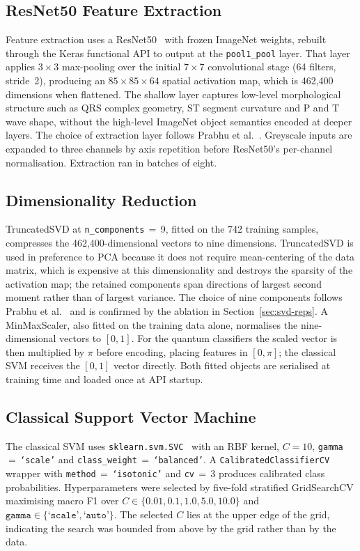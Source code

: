 \documentclass[10pt,conference]{IEEEtran}
\begin{document}
\subsection{ResNet50 Feature Extraction}

Feature extraction uses a ResNet50~\cite{he2016} with frozen ImageNet
weights, rebuilt through the Keras functional API to output at the
\texttt{pool1\_pool} layer. That layer applies $3\!\times\!3$
max-pooling over the initial $7\!\times\!7$ convolutional stage (64
filters, stride~2), producing an $85\!\times\!85\!\times\!64$ spatial
activation map, which is 462,400 dimensions when flattened. The shallow
layer captures low-level morphological structure such as QRS complex
geometry, ST segment curvature and P and T wave shape, without the
high-level ImageNet object semantics encoded at deeper layers. The
choice of extraction layer follows Prabhu et al.~\cite{prabhu2023}.
Greyscale inputs are expanded to three channels by axis repetition
before ResNet50's per-channel normalisation. Extraction ran in batches
of eight.

\subsection{Dimensionality Reduction}

TruncatedSVD at \texttt{n\_components}\,$=$\,9, fitted on the 742
training samples, compresses the 462,400-dimensional vectors to nine
dimensions. TruncatedSVD is used in preference to PCA because it does
not require mean-centering of the data matrix, which is expensive at
this dimensionality and destroys the sparsity of the activation map;
the retained components span directions of largest second moment rather
than of largest variance. The choice of nine components follows Prabhu
et al.~\cite{prabhu2023} and is confirmed by the ablation in
Section~\ref{sec:svd-reps}. A MinMaxScaler, also fitted on the training
data alone, normalises the nine-dimensional vectors to $[0,1]$. For the
quantum classifiers the scaled vector is then multiplied by $\pi$ before
encoding, placing features in $[0,\pi]$; the classical SVM receives the
$[0,1]$ vector directly. Both fitted objects are serialised at training
time and loaded once at API startup.

\subsection{Classical Support Vector Machine}

The classical SVM uses \texttt{sklearn.svm.SVC}~\cite{sklearn} with an
RBF kernel, $C\!=\!10$, \texttt{gamma}\,$=$\,\texttt{`scale'} and
\texttt{class\_weight}\,$=$\,\texttt{`balanced'}. A
\texttt{CalibratedClassifierCV} wrapper with
\texttt{method}\,$=$\,\texttt{`isotonic'} and \texttt{cv}\,$=$\,3
produces calibrated class probabilities. Hyperparameters were selected
by five-fold stratified GridSearchCV maximising macro F1 over
$C\in\{0.01,0.1,1.0,5.0,10.0\}$ and
$\texttt{gamma}\in\{\texttt{`scale'},\texttt{`auto'}\}$. The selected
$C$ lies at the upper edge of the grid, indicating the search was
bounded from above by the grid rather than by the data.
\end{document}
